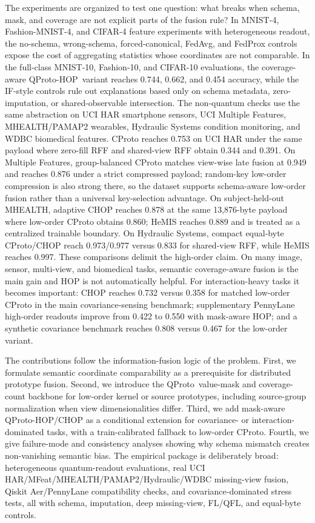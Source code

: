 \documentclass[preprint]{elsarticle}
\newcommand{\method}{QProto}
\newcommand{\hopmethod}{QProto-HOP}
\begin{document}
The experiments are organized to test one question: what breaks when schema, mask, and coverage are not explicit parts of the fusion rule? In MNIST-4, Fashion-MNIST-4, and CIFAR-4 feature experiments with heterogeneous readout, the no-schema, wrong-schema, forced-canonical, FedAvg, and FedProx controls expose the cost of aggregating statistics whose coordinates are not comparable. In the full-class MNIST-10, Fashion-10, and CIFAR-10 evaluations, the coverage-aware \hopmethod\ variant reaches 0.744, 0.662, and 0.454 accuracy, while the IF-style controls rule out explanations based only on schema metadata, zero-imputation, or shared-observable intersection. The non-quantum checks use the same abstraction on UCI HAR smartphone sensors, UCI Multiple Features, MHEALTH/PAMAP2 wearables, Hydraulic Systems condition monitoring, and WDBC biomedical features. CProto reaches 0.753 on UCI HAR under the same payload where zero-fill RFF and shared-view RFF obtain 0.344 and 0.391. On Multiple Features, group-balanced CProto matches view-wise late fusion at 0.949 and reaches 0.876 under a strict compressed payload; random-key low-order compression is also strong there, so the dataset supports schema-aware low-order fusion rather than a universal key-selection advantage. On subject-held-out MHEALTH, adaptive CHOP reaches 0.878 at the same 13,876-byte payload where low-order CProto obtains 0.860; HeMIS reaches 0.889 and is treated as a centralized trainable boundary. On Hydraulic Systems, compact equal-byte CProto/CHOP reach 0.973/0.977 versus 0.833 for shared-view RFF, while HeMIS reaches 0.997. These comparisons delimit the high-order claim. On many image, sensor, multi-view, and biomedical tasks, semantic coverage-aware fusion is the main gain and HOP is not automatically helpful. For interaction-heavy tasks it becomes important: CHOP reaches 0.732 versus 0.358 for matched low-order CProto in the main covariance-sensing benchmark; supplementary PennyLane high-order readouts improve from 0.422 to 0.550 with mask-aware HOP; and a synthetic covariance benchmark reaches 0.808 versus 0.467 for the low-order variant.

The contributions follow the information-fusion logic of the problem. First, we formulate semantic coordinate comparability as a prerequisite for distributed prototype fusion. Second, we introduce the \method\ value-mask and coverage-count backbone for low-order kernel or source prototypes, including source-group normalization when view dimensionalities differ. Third, we add mask-aware \hopmethod/CHOP as a conditional extension for covariance- or interaction-dominated tasks, with a train-calibrated fallback to low-order CProto. Fourth, we give failure-mode and consistency analyses showing why schema mismatch creates non-vanishing semantic bias. The empirical package is deliberately broad: heterogeneous quantum-readout evaluations, real UCI HAR/MFeat/MHEALTH/PAMAP2/Hydraulic/WDBC missing-view fusion, Qiskit Aer/PennyLane compatibility checks, and covariance-dominated stress tests, all with schema, imputation, deep missing-view, FL/QFL, and equal-byte controls.
\end{document}
